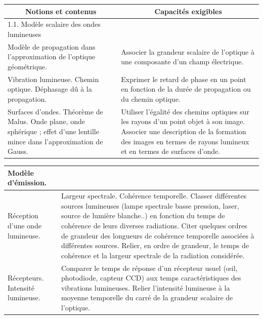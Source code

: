 {\scriptsize
\begin{minipage}{0.5\textwidth}
    \begin{tabularx}{\linewidth}{|X|X|}
        \hline \multicolumn{1}{|c|}{ Notions et contenus } & \multicolumn{1}{c|}{ Capacités exigibles } \\
        \hline 1.1. Modèle scalaire des ondes lumineuses \\
        \hline 
        Modèle de propagation dans l'approximation de l'optique géométrique. & 
        Associer la grandeur scalaire de l'optique à une composante d'un champ électrique. \\
        \hline 
        Vibration lumineuse. Chemin optique. Déphasage dû à la propagation. & 
        Exprimer le retard de phase en un point en fonction de la durée de propagation ou du chemin optique. \\
        \hline 
        Surfaces d'ondes. Théorème de Malus. Onde plane, onde sphérique ; effet d'une lentille mince dans l'approximation de Gauss. & 
        Utiliser l'égalité des chemins optiques sur les rayons d'un point objet à son image. Associer une description de la formation des images en termes de rayons lumineux et en termes de surfaces d'onde. \\
        \hline
    \end{tabularx}
\end{minipage}%
\begin{minipage}{0.5\textwidth}
    \begin{tabularx}{\linewidth}{|p{3cm}|X|}
        \hline Modèle d'émission. & \\
        \hline Réception d'une onde lumineuse. & 
        Largeur spectrale. Cohérence temporelle. 
        Classer différentes sources lumineuses 
        (lampe spectrale basse pression, laser, 
        source de lumière blanche..) en fonction du 
        temps de cohérence de leurs diverses 
        radiations. 
        Citer quelques ordres de grandeur des 
        longueurs de cohérence temporelle 
        associées à différentes sources. 
        Relier, en ordre de grandeur, le temps de 
        cohérence et la largeur spectrale de la 
        radiation considérée. \\
        \hline Récepteurs. Intensité lumineuse. & 
        Comparer le temps de réponse d'un 
        récepteur usuel (œil, photodiode, capteur 
        CCD) aux temps caractéristiques des 
        vibrations lumineuses. 
        Relier l'intensité lumineuse à la moyenne 
        temporelle du carré de la grandeur scalaire 
        de l'optique. \\
        \hline
    \end{tabularx}
\end{minipage}
}

